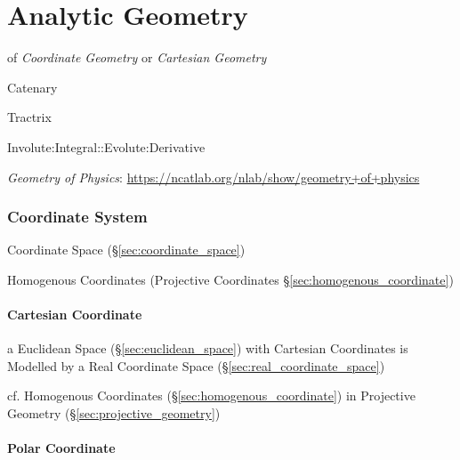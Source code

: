 \part{Analytic Geometry}\label{sec:analytic_geometry}

of \emph{Coordinate Geometry} or \emph{Cartesian Geometry}

Catenary

Tractrix

Involute:Integral::Evolute:Derivative


\fist \emph{Geometry of Physics}:
\url{https://ncatlab.org/nlab/show/geometry+of+physics}



\section{Coordinate System}\label{sec:coordinate_system}

Coordinate Space (\S\ref{sec:coordinate_space})

Homogenous Coordinates (Projective Coordinates
\S\ref{sec:homogenous_coordinate})



\subsection{Cartesian Coordinate}\label{sec:cartesian_coordinate}

a Euclidean Space (\S\ref{sec:euclidean_space}) with Cartesian
Coordinates is Modelled by a Real Coordinate Space
(\S\ref{sec:real_coordinate_space})

cf. Homogenous Coordinates (\S\ref{sec:homogenous_coordinate}) in
Projective Geometry (\S\ref{sec:projective_geometry})



\subsection{Polar Coordinate}\label{sec:polar_coordinate}

